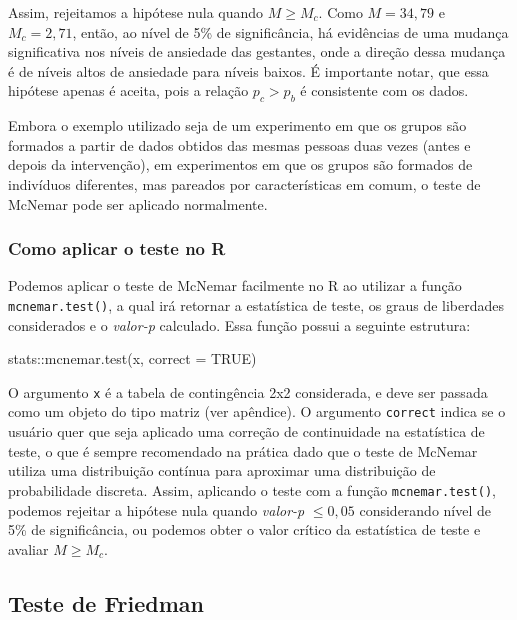 \documentclass[
  letterpaper,
  DIV=11,
  numbers=noendperiod]{scrreprt}
\newenvironment{Shaded}{\begin{snugshade}}{\end{snugshade}}
\newcommand{\AttributeTok}[1]{\textcolor[rgb]{0.40,0.45,0.13}{#1}}
\newcommand{\ConstantTok}[1]{\textcolor[rgb]{0.56,0.35,0.01}{#1}}
\newcommand{\FunctionTok}[1]{\textcolor[rgb]{0.28,0.35,0.67}{#1}}
\newcommand{\NormalTok}[1]{\textcolor[rgb]{0.00,0.23,0.31}{#1}}
\newcommand{\SpecialCharTok}[1]{\textcolor[rgb]{0.37,0.37,0.37}{#1}}
\begin{document}
Assim, rejeitamos a hipótese nula quando \(M \geq M_c\). Como
\(M = 34,79\) e \(M_c = 2,71\), então, ao nível de 5\% de significância,
há evidências de uma mudança significativa nos níveis de ansiedade das
gestantes, onde a direção dessa mudança é de níveis altos de ansiedade
para níveis baixos. É importante notar, que essa hipótese apenas é
aceita, pois a relação \(p_c > p_b\) é consistente com os dados.

Embora o exemplo utilizado seja de um experimento em que os grupos são
formados a partir de dados obtidos das mesmas pessoas duas vezes (antes
e depois da intervenção), em experimentos em que os grupos são formados
de indivíduos diferentes, mas pareados por características em comum, o
teste de McNemar pode ser aplicado normalmente.

\hypertarget{como-aplicar-o-teste-no-r-4}{%
\subsubsection{Como aplicar o teste no
R}\label{como-aplicar-o-teste-no-r-4}}

Podemos aplicar o teste de McNemar facilmente no R ao utilizar a função
\texttt{mcnemar.test()}, a qual irá retornar a estatística de teste, os
graus de liberdades considerados e o \emph{valor-p} calculado. Essa
função possui a seguinte estrutura:

\begin{Shaded}
\begin{Highlighting}[]
\NormalTok{stats}\SpecialCharTok{::}\FunctionTok{mcnemar.test}\NormalTok{(x, }\AttributeTok{correct =} \ConstantTok{TRUE}\NormalTok{)}
\end{Highlighting}
\end{Shaded}

O argumento \texttt{x} é a tabela de contingência 2x2 considerada, e
deve ser passada como um objeto do tipo matriz (ver apêndice). O
argumento \texttt{correct} indica se o usuário quer que seja aplicado
uma correção de continuidade na estatística de teste, o que é sempre
recomendado na prática dado que o teste de McNemar utiliza uma
distribuição contínua para aproximar uma distribuição de probabilidade
discreta. Assim, aplicando o teste com a função \texttt{mcnemar.test()},
podemos rejeitar a hipótese nula quando \emph{valor-p} \(\leq 0,05\)
considerando nível de 5\% de significância, ou podemos obter o valor
crítico da estatística de teste e avaliar \(M \geq M_c\).

\hypertarget{teste-de-friedman}{%
\subsection{Teste de Friedman}\label{teste-de-friedman}}
\end{document}
